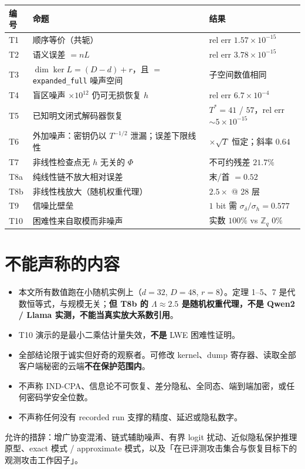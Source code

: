 \documentclass[UTF8, fontset=macnew, 11pt]{ctexart}
\newcommand{\kerL}{\ker L}
\begin{document}
\begin{center}
\small
\renewcommand{\arraystretch}{1.25}
\begin{tabular}{@{}l L{6.6cm} l@{}}
\toprule
编号 & 命题 & 结果 \\
\midrule
T1  & 顺序等价（共轭） & rel err $1.57\times10^{-15}$ \\
T2  & 语义误差 $=nL$ & rel err $3.78\times10^{-15}$ \\
T3  & $\dim\kerL=(D{-}d){+}r$，且 $=$ \texttt{expanded\_full} 噪声空间 & 子空间数值相同 \\
T4  & 盲区噪声 $\times10^{12}$ 仍可无损恢复 $h$ & rel err $6.7\times10^{-4}$ \\
T5  & 已知明文闭式解码器恢复 & $T^{*}{=}41$ / $57$，rel err $\sim5\times10^{-15}$ \\
T6  & 外加噪声：密钥仍以 $T^{-1/2}$ 泄漏；误差下限线性 & $\times\sqrt T$ 恒定；斜率 $0.64$ \\
T7  & 非线性检查点无 $h$ 无关的 $\Phi$ & 不可约残差 $21.7\%$ \\
T8a & 纯线性链不放大相对误差 & 末/首 $=0.52$ \\
T8b & 非线性栈放大（随机权重代理） & $2.5\times$ @ 28 层 \\
T9  & 信噪比壁垒 & $1$ bit 需 $\sigma_\delta/\sigma_h=0.577$ \\
T10 & 困难性来自取模而非噪声 & 实数 $100\%$ vs $\mathbb Z_q$ $0\%$ \\
\bottomrule
\end{tabular}
\end{center}

\section{不能声称的内容}

\begin{warnbox}[边界]
\begin{itemize}
  \item 本文所有数值跑在小随机实例上（$d{=}32$, $D{=}48$, $r{=}8$）。定理 1--5、7 是代数恒等式，与规模无关；\textbf{但 T8b 的 $\Lambda\approx2.5$ 是随机权重代理，不是 Qwen2 / Llama 实测，不能当真实放大系数引用}。
  \item T10 演示的是最小二乘估计量失效，\textbf{不是} LWE 困难性证明。
  \item 全部结论限于诚实但好奇的观察者。可修改 kernel、dump 寄存器、读取全部客户端秘密的云端\textbf{不在保护范围内}。
  \item 不声称 IND-CPA、信息论不可恢复、差分隐私、全同态、端到端加密，或任何密码学安全位数。
  \item 不声称任何没有 recorded run 支撑的精度、延迟或隐私数字。
\end{itemize}

允许的措辞：增广协变混淆、链式辅助噪声、有界 logit 扰动、近似隐私保护推理原型、exact 模式 / approximate 模式，以及「在已评测攻击集合与恢复目标下的观测攻击工作因子」。
\end{warnbox}
\end{document}
